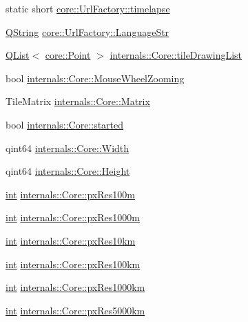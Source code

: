\begin{DoxyCompactItemize}
\item 
static short \hyperlink{group___o_p_map_widget_ga5dba09925e03ae10c70290f9a2e9cc61}{core\-::\-Url\-Factory\-::timelapse}
\item 
\hyperlink{group___u_a_v_objects_plugin_gab9d252f49c333c94a72f97ce3105a32d}{Q\-String} \hyperlink{group___o_p_map_widget_ga5d9399e074794da8ad0593e87e554228}{core\-::\-Url\-Factory\-::\-Language\-Str}
\item 
\hyperlink{class_q_list}{Q\-List}$<$ \hyperlink{structcore_1_1_point}{core\-::\-Point} $>$ \hyperlink{group___o_p_map_widget_gaef8eae2b290cfd062061e8baaebe51d6}{internals\-::\-Core\-::tile\-Drawing\-List}
\item 
bool \hyperlink{group___o_p_map_widget_ga051b1520271b875b55fa1023041a16e6}{internals\-::\-Core\-::\-Mouse\-Wheel\-Zooming}
\item 
Tile\-Matrix \hyperlink{group___o_p_map_widget_ga4ac91c5f728a51e821a9cec0abf347fd}{internals\-::\-Core\-::\-Matrix}
\item 
bool \hyperlink{group___o_p_map_widget_ga797e80c1349c656593de207aa74935de}{internals\-::\-Core\-::started}
\item 
qint64 \hyperlink{group___o_p_map_widget_ga3d5e76b481e1832dff58d33176b6a158}{internals\-::\-Core\-::\-Width}
\item 
qint64 \hyperlink{group___o_p_map_widget_ga9a5a3c48699aba8ef9582514fca243f0}{internals\-::\-Core\-::\-Height}
\item 
\hyperlink{ioapi_8h_a787fa3cf048117ba7123753c1e74fcd6}{int} \hyperlink{group___o_p_map_widget_ga0f93533bcdd67093c6da41e069997291}{internals\-::\-Core\-::px\-Res100m}
\item 
\hyperlink{ioapi_8h_a787fa3cf048117ba7123753c1e74fcd6}{int} \hyperlink{group___o_p_map_widget_gaa0947582a08d181d668db653fa4ed991}{internals\-::\-Core\-::px\-Res1000m}
\item 
\hyperlink{ioapi_8h_a787fa3cf048117ba7123753c1e74fcd6}{int} \hyperlink{group___o_p_map_widget_gaff97208acbd79e92f35d678a5651d063}{internals\-::\-Core\-::px\-Res10km}
\item 
\hyperlink{ioapi_8h_a787fa3cf048117ba7123753c1e74fcd6}{int} \hyperlink{group___o_p_map_widget_gab81b3e64348e0d02e67bd4f7350656cc}{internals\-::\-Core\-::px\-Res100km}
\item 
\hyperlink{ioapi_8h_a787fa3cf048117ba7123753c1e74fcd6}{int} \hyperlink{group___o_p_map_widget_ga5abde0bbaaa9517978da18398333e69b}{internals\-::\-Core\-::px\-Res1000km}
\item 
\hyperlink{ioapi_8h_a787fa3cf048117ba7123753c1e74fcd6}{int} \hyperlink{group___o_p_map_widget_gaed5c41c8c2b585074948d5918ae1a480}{internals\-::\-Core\-::px\-Res5000km}

\end{DoxyCompactItemize}
